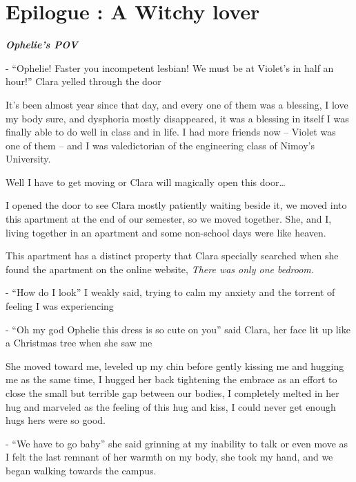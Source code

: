 \documentclass[hidelinks,12pt]{book}
\begin{document}
\chapter{Epilogue : A Witchy lover}
\textit{\textbf{Ophelie's POV}}

- “Ophelie! Faster you incompetent lesbian! We must be at Violet's in half an hour!” Clara yelled through the door\par
\bigskip

It's been almost year since that day, and every one of them was a blessing, I love my body sure, and dysphoria mostly 
disappeared, it was a blessing in itself I was finally able to do well in class and in life. I had more friends now 
-- Violet was one of them -- and I was valedictorian of the engineering class of Nimoy's University.\par
\bigskip

Well I have to get moving or Clara will magically open this door…\par
I opened the door to see Clara mostly patiently waiting beside it, we moved into this apartment at the end of our 
semester, so we moved together. She, and I, living together in an apartment and some non-school days were like heaven.\par
\bigskip

This apartment has a distinct property that Clara specially searched when she found the apartment on the online website,
\textit{There was only one bedroom.}\par 
\bigskip


- “How do I look” I weakly said, trying to calm my anxiety and the torrent of feeling I was experiencing\par
- “Oh my god Ophelie this dress is so cute on you” said Clara, her face lit up like a Christmas tree when she saw me\par
\bigskip

She moved toward me, leveled up my chin before gently kissing me and hugging me as the same time, I hugged her back 
tightening the embrace as an effort to close the small but terrible gap between our bodies, I completely melted in 
her hug and marveled as the feeling of this hug and kiss, I could never get enough hugs hers were so good.\par 
\bigskip 

- “We have to go baby” she said grinning at my inability to talk or even move as I felt the last remnant of her warmth 
on my body, she took my hand, and we began walking towards the campus.
\end{document}

